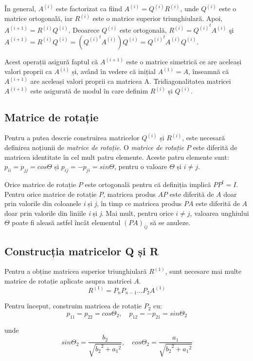 \documentclass{exam}
\begin{document}
În general, $A^{(i)}$ este factorizat ca fiind $A^{(i)} = Q^{(i)}R^{(i)}$, unde $Q^{(i)}$ este o matrice ortogonală, iar $R^{(i)}$ este o matrice superior triunghiulară. Apoi, $A^{(i+1)} = R^{(i)}Q^{(i)}$. Deoarece $Q^{(i)}$ este ortogonală, $R^{(i)} = {Q^{(i)}}^{t}A^{(i)}$ şi
$A^{(i+1)} = R^{(i)}Q^{(i)} = ({Q^{(i)}}^{t}A^{(i)})Q^{(i)} = {Q^{(i)}}^{t}A^{(i)}Q^{(i)}.$

Acest operații asigură faptul că $A^{(i+1)}$ este o matrice simetrică ce are aceleași valori proprii ca $A^{(i)}$ și, având în vedere că inițial $A^{(1)} = A$, înseamnă că $A^{(i+1)}$ are aceleași valori proprii ca matricea A. Tridiagonalitatea matricei $A^{(i+1)}$ este asigurată de modul în care definim $R^{(i)}$ și $Q^{(i)}$.

\subsection{Matrice de rotație}

Pentru a putea descrie construirea matricelor $Q^{(i)}$ și $R^{(i)}$, este necesară definirea noțiunii de \textit{matrice de rotație}. O \textit{matrice de rotație} $P$ este diferită de matricea identitate în cel mult patru elemente. Aceste patru \mbox{elemente} sunt: $p_{ii} = p_{jj} = cos\Theta$ și $p_{ij} = -p_{ji} = sin\Theta$, pentru o valoare $\Theta$ și $i\neq j$.


Orice matrice de rotație $P$ este ortogonală pentru că definiția implică $PP^{t} = I$. Pentru orice matrice de rotație $P$, matricea produs $AP$ este diferită de $A$ doar prin valorile din coloanele \textit{i} și \textit{j}, în timp ce matricea produs $PA$ este diferită de $A$ doar prin valorile din liniile \textit{i} și \textit{j}. Mai mult, pentru orice $i\neq j$, valoarea unghiului $\Theta$ poate fi aleasă astfel încât elementul $(PA)_{ij}$ să se anuleze.


\subsection{Construcția matricelor Q și R}

Pentru a obține matricea  superior triunghiulară $R^{(1)}$, sunt necesare mai multe matrice de rotație aplicate asupra matricei $A$.
$$R^{(1)} = P_{n}P_{n-1}...P_{2}A^{(1)}$$

Pentru început, construim matricea de rotație $P_{2}$ cu:
$$p_{11} = p_{22} = cos\Theta_{2}, \quad  p_{12} = -p_{21} = sin\Theta_{2}$$

\noindent unde
$$sin\Theta_{2}=\frac{b_{2}}{\sqrt{{b_{2}}^{2}+{{a_{1}}^{2}}}}, \quad  cos\Theta_{2}=\frac{a_{1}}{\sqrt{{b_{2}}^{2}+{{a_{1}}^{2}}}}$$
\end{document}
